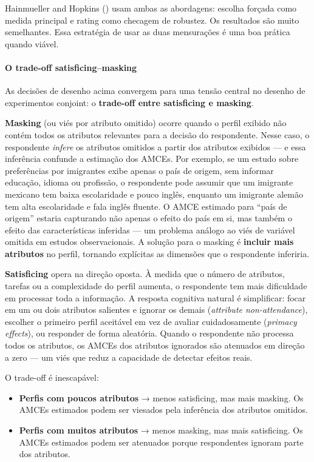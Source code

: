 \documentclass[
]{article}
\providecommand{\tightlist}{%
  \setlength{\itemsep}{0pt}\setlength{\parskip}{0pt}}
\begin{document}
Hainmueller and Hopkins () usam ambas as abordagens: escolha forçada como medida principal e rating como checagem de robustez. Os resultados são muito semelhantes. Essa estratégia de usar as duas mensurações é uma boa prática quando viável.

\paragraph{O trade-off satisficing--masking}\label{o-trade-off-satisficingmasking}

As decisões de desenho acima convergem para uma tensão central no desenho de experimentos conjoint: o \textbf{trade-off entre satisficing e masking}.

\textbf{Masking} (ou viés por atributo omitido) ocorre quando o perfil exibido não contém todos os atributos relevantes para a decisão do respondente. Nesse caso, o respondente \emph{infere} os atributos omitidos a partir dos atributos exibidos --- e essa inferência confunde a estimação dos AMCEs. Por exemplo, se um estudo sobre preferências por imigrantes exibe apenas o país de origem, sem informar educação, idioma ou profissão, o respondente pode assumir que um imigrante mexicano tem baixa escolaridade e pouco inglês, enquanto um imigrante alemão tem alta escolaridade e fala inglês fluente. O AMCE estimado para ``país de origem'' estaria capturando não apenas o efeito do país em si, mas também o efeito das características inferidas --- um problema análogo ao viés de variável omitida em estudos observacionais. A solução para o masking é \textbf{incluir mais atributos} no perfil, tornando explícitas as dimensões que o respondente inferiria.

\textbf{Satisficing} opera na direção oposta. À medida que o número de atributos, tarefas ou a complexidade do perfil aumenta, o respondente tem mais dificuldade em processar toda a informação. A resposta cognitiva natural é simplificar: focar em um ou dois atributos salientes e ignorar os demais (\emph{attribute non-attendance}), escolher o primeiro perfil aceitável em vez de avaliar cuidadosamente (\emph{primacy effects}), ou responder de forma aleatória. Quando o respondente não processa todos os atributos, os AMCEs dos atributos ignorados são atenuados em direção a zero --- um viés que reduz a capacidade de detectar efeitos reais.

O trade-off é inescapável:

\begin{itemize}
\tightlist
\item
  \textbf{Perfis com poucos atributos} → menos satisficing, mas mais masking. Os AMCEs estimados podem ser viesados pela inferência dos atributos omitidos.
\item
  \textbf{Perfis com muitos atributos} → menos masking, mas mais satisficing. Os AMCEs estimados podem ser atenuados porque respondentes ignoram parte dos atributos.
\end{itemize}
\end{document}
